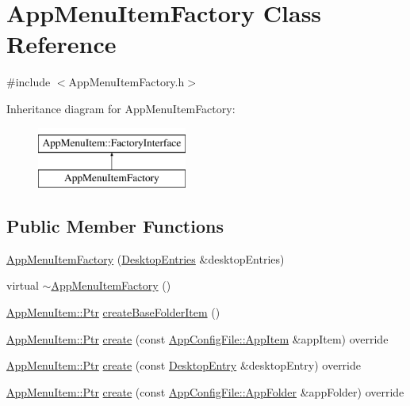 \hypertarget{classAppMenuItemFactory}{}\section{App\+Menu\+Item\+Factory Class Reference}
\label{classAppMenuItemFactory}


{\ttfamily \#include $<$App\+Menu\+Item\+Factory.\+h$>$}

Inheritance diagram for App\+Menu\+Item\+Factory\+:\begin{figure}[H]
\begin{center}
\leavevmode
\includegraphics[height=2.000000cm]{classAppMenuItemFactory}
\end{center}
\end{figure}
\subsection*{Public Member Functions}
\begin{DoxyCompactItemize}
\item 
\mbox{\hyperlink{classAppMenuItemFactory_aa3715de15c9f0ef001b26c5a09af1634}{App\+Menu\+Item\+Factory}} (\mbox{\hyperlink{classDesktopEntries}{Desktop\+Entries}} \&desktop\+Entries)
\item 
virtual \mbox{\hyperlink{classAppMenuItemFactory_a737f91df4d228b97623ad2be87b1bfb9}{$\sim$\+App\+Menu\+Item\+Factory}} ()
\item 
\mbox{\hyperlink{classAppMenuItem_ab5f51c5d74f8df62b8862c0cc8126cb7}{App\+Menu\+Item\+::\+Ptr}} \mbox{\hyperlink{classAppMenuItemFactory_ab4e1c1019c09f110ff17091a45c918f0}{create\+Base\+Folder\+Item}} ()
\item 
\mbox{\hyperlink{classAppMenuItem_ab5f51c5d74f8df62b8862c0cc8126cb7}{App\+Menu\+Item\+::\+Ptr}} \mbox{\hyperlink{classAppMenuItemFactory_a018510777d99cbda23a0aea41f90c4f9}{create}} (const \mbox{\hyperlink{structAppConfigFile_1_1AppItem}{App\+Config\+File\+::\+App\+Item}} \&app\+Item) override
\item 
\mbox{\hyperlink{classAppMenuItem_ab5f51c5d74f8df62b8862c0cc8126cb7}{App\+Menu\+Item\+::\+Ptr}} \mbox{\hyperlink{classAppMenuItemFactory_a6b77c85063b587a6f5930fa9e94908eb}{create}} (const \mbox{\hyperlink{classDesktopEntry}{Desktop\+Entry}} \&desktop\+Entry) override
\item 
\mbox{\hyperlink{classAppMenuItem_ab5f51c5d74f8df62b8862c0cc8126cb7}{App\+Menu\+Item\+::\+Ptr}} \mbox{\hyperlink{classAppMenuItemFactory_a39e1a6e96d7c22413cb396a46b496804}{create}} (const \mbox{\hyperlink{structAppConfigFile_1_1AppFolder}{App\+Config\+File\+::\+App\+Folder}} \&app\+Folder) override
\end{DoxyCompactItemize}
